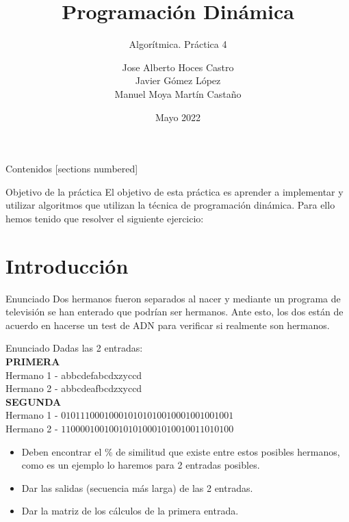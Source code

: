 \documentclass[10pt, xcolor=table]{beamer}
\title{Programación Dinámica}
\subtitle{Algorítmica. \alert{Práctica 4}}
\date{Mayo 2022}
\author{Jose Alberto Hoces Castro\\Javier Gómez López\\ Manuel Moya Martín Castaño\\[4pt]}
\begin{document}
\maketitle

\begin{frame}{Contenidos}
	[sections numbered]
	\tableofcontents[]
\end{frame}

\begin{frame}[fragile]{Objetivo de la práctica}
	El objetivo de esta práctica es aprender a implementar y utilizar algoritmos que utilizan la técnica de programación dinámica. Para ello hemos tenido que resolver el siguiente ejercicio:
\end{frame}

\section{Introducción}
\begin{frame}[fragile]{Enunciado}
Dos hermanos fueron separados al nacer y mediante un programa de televisión se han enterado que podrían ser hermanos. Ante esto, los dos están de acuerdo en hacerse un test de ADN para verificar si realmente son hermanos.
\end{frame}

\begin{frame}[fragile]{Enunciado}
Dadas las 2 entradas:\\

\textbf{PRIMERA} \\
Hermano 1 - abbcdefabcdxzyccd \\
Hermano 2 - abbcdeafbcdzxyccd \\

\textbf{SEGUNDA}\\
Hermano 1 - $010111000100010101010010001001001001$\\
Hermano 2 - $110000100100101010001010010011010100$\\

	\begin{itemize}
		\item Deben encontrar el \% de similitud que existe entre estos posibles hermanos, como es un ejemplo lo haremos para 2 entradas posibles.
		\item Dar las salidas (secuencia más larga) de las 2 entradas.
		\item Dar la matriz de los cálculos de la primera entrada.
	\end{itemize}

\end{frame}
\end{document}
